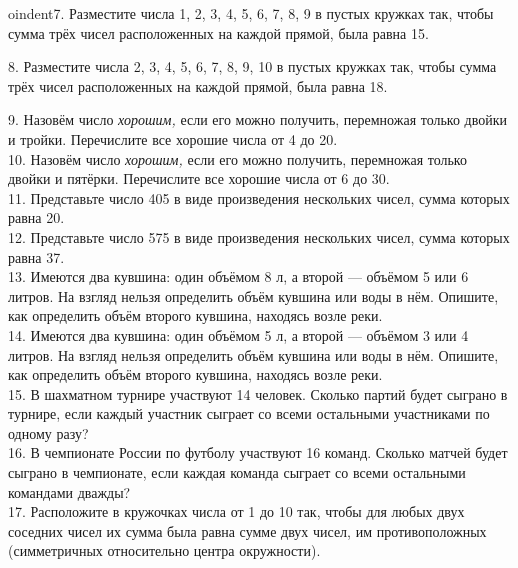 oindent7. Разместите числа 1, 2, 3, 4, 5, 6, 7, 8, 9 в пустых кружках так, чтобы сумма трёх чисел расположенных на каждой прямой, была равна 15.
\begin{center}
\begin{figure}[h!]
\end{figure}
\end{center}
8. Разместите числа 2, 3, 4, 5, 6, 7, 8, 9, 10 в пустых кружках так, чтобы сумма трёх чисел расположенных на каждой прямой, была равна 18.
\begin{center}
\begin{figure}[h!]
\end{figure}
\end{center}
9. Назовём число {\it хорошим,} если его можно получить, перемножая только двойки и тройки. Перечислите все хорошие числа от 4 до 20.\\
10. Назовём число {\it хорошим,} если его можно получить, перемножая только двойки и пятёрки. Перечислите все хорошие числа от 6 до 30.\\
11. Представьте число 405 в виде произведения нескольких чисел, сумма которых равна 20.\\
12. Представьте число 575 в виде произведения нескольких чисел, сумма которых равна 37.\\
13. Имеются два кувшина: один объёмом 8 л, а второй --- объёмом 5 или 6 литров. На взгляд нельзя определить объём кувшина или воды в нём. Опишите, как определить объём второго кувшина, находясь возле реки.\\
14. Имеются два кувшина: один объёмом 5 л, а второй --- объёмом 3 или 4 литров. На взгляд нельзя определить объём кувшина или воды в нём. Опишите, как определить объём второго кувшина, находясь возле реки.\\
15. В шахматном турнире участвуют 14 человек. Сколько партий будет сыграно в турнире, если каждый участник сыграет со всеми остальными участниками по одному разу?\\
16. В чемпионате России по футболу участвуют 16 команд. Сколько матчей будет сыграно в чемпионате, если каждая команда сыграет со всеми остальными командами дважды?\\
17. Расположите в кружочках числа от 1 до 10 так, чтобы для любых двух соседних чисел их сумма была равна сумме двух чисел, им противоположных (симметричных относительно центра окружности).
\begin{center}
\begin{figure}[ht!]
\end{figure}
\end{center}


